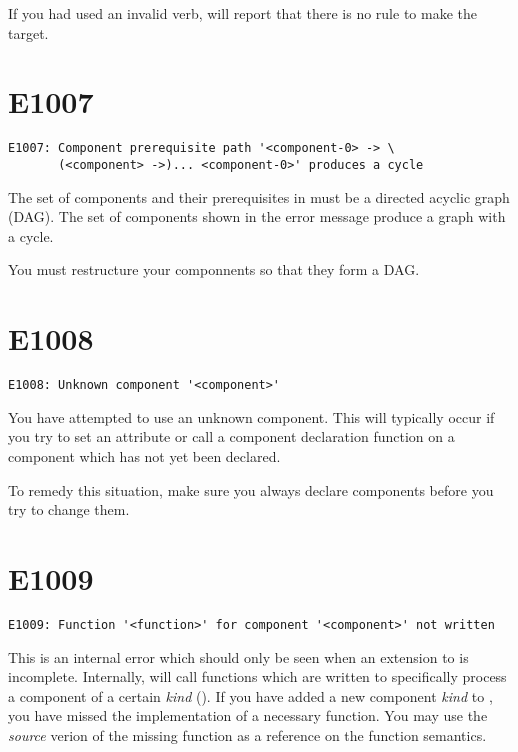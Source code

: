 If you had used an invalid verb, \lmsbw will report that there is no
rule to make the target.

\section{E1007}

\begin{verbatim}
E1007: Component prerequisite path '<component-0> -> \
       (<component> ->)... <component-0>' produces a cycle
\end{verbatim}

The set of components and their prerequisites in \lmsbw must be a
directed acyclic graph (DAG).  The set of components shown in the
error message produce a graph with a cycle.

You must restructure your componnents so that they form a DAG.

\section{E1008}

\begin{verbatim}
E1008: Unknown component '<component>'
\end{verbatim}

You have attempted to use an unknown component.  This will typically
occur if you try to set an attribute or call a component declaration
function on a component which has not yet been declared.

To remedy this situation, make sure you always declare components
before you try to change them.

\section{E1009}

\begin{verbatim}
E1009: Function '<function>' for component '<component>' not written
\end{verbatim}

This is an internal error which should only be seen when an extension
to \lmsbw is incomplete.  Internally, \lmsbw will call functions which
are written to specifically process a component of a certain
\emph{kind} ().  If you have added a new
component \emph{kind} to \lmsbw, you have missed the implementation of
a necessary function.  You may use the \emph{source} verion of the
missing function as a reference on the function semantics.

